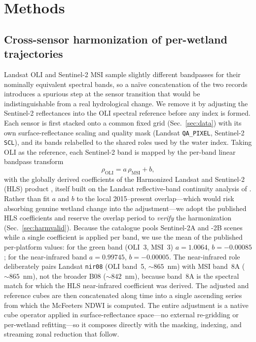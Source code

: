 \documentclass[review]{elsarticle}
\begin{document}

\section{Methods}\label{sec:methods}

\subsection{Cross-sensor harmonization of per-wetland trajectories}\label{sec:harmonize}
Landsat OLI and Sentinel-2 MSI sample slightly different bandpasses for their
nominally equivalent spectral bands, so a na\"ive concatenation of the two
records introduces a spurious step at the sensor transition that would be
indistinguishable from a real hydrological change. We remove it by adjusting
the Sentinel-2 reflectances into the OLI spectral reference before any index is
formed. Each sensor is first stacked onto a common fixed grid
(Sec.~\ref{sec:data}) with its own surface-reflectance scaling and quality mask
(Landsat \texttt{QA\_PIXEL}, Sentinel-2 \texttt{SCL}), and its bands relabelled
to the shared roles used by the water index. Taking OLI as the reference, each
Sentinel-2 band is mapped by the per-band linear bandpass transform
\begin{equation}\label{eq:bandpass}
  \rho_{\mathrm{OLI}} = a\,\rho_{\mathrm{MSI}} + b ,
\end{equation}
with the globally derived coefficients of the Harmonized Landsat and Sentinel-2
(HLS) product \citep{claverie2018}, itself built on the Landsat reflective-band
continuity analysis of \citet{roy2016}. Rather than fit $a$ and $b$ to the local
2015--present overlap---which would risk absorbing genuine wetland change into
the adjustment---we adopt the published HLS coefficients and reserve the overlap
period to \emph{verify} the harmonization (Sec.~\ref{sec:harmvalid}). Because the
catalogue pools Sentinel-2A and -2B scenes while a single coefficient is applied
per band, we use the mean of the published per-platform values: for the green
band (OLI~3, MSI~3) $a=1.0064$, $b=-0.00085$; for the near-infrared band
$a=0.99745$, $b=-0.00005$. The near-infrared role deliberately pairs Landsat
\texttt{nir08} (OLI band~5, ${\sim}865$~nm) with MSI band~8A (${\sim}865$~nm),
not the broader B08 (${\sim}842$~nm), because band~8A is the spectral match for
which the HLS near-infrared coefficient was derived. The adjusted and reference
cubes are then concatenated along time into a single ascending series from which
the McFeeters NDWI is computed. The entire adjustment is a native cube operator
applied in surface-reflectance space---no external re-gridding or per-wetland
refitting---so it composes directly with the masking, indexing, and streaming
zonal reduction that follow.
\end{document}
